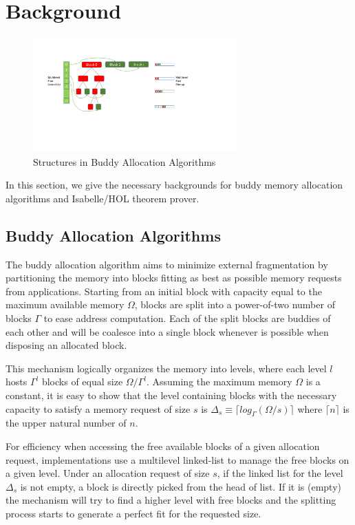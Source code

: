 \section{Background}
\begin{figure}[htbp]
	\centering
	\includegraphics[width=0.7\textwidth]{fig3.pdf}
	\caption{Structures in Buddy Allocation Algorithms}
	\label{fig3}
\end{figure}
In this section, we give the necessary backgrounds for buddy memory allocation algorithms and Isabelle/HOL theorem prover.

\subsection{Buddy Allocation Algorithms}\label{sec:buddy}
The buddy allocation algorithm aims to minimize external fragmentation by partitioning the memory into blocks fitting as best as possible memory requests from applications. Starting from an initial block with capacity equal to the maximum available memory $\Omega$, blocks are split into a power-of-two number of blocks $\Gamma$ to ease address computation. Each of the split blocks are buddies of each other and will be coalesce into a single block whenever is possible when disposing an allocated block. 

This mechanism logically organizes the memory into levels, where each level $l$ hosts $\Gamma^l$ blocks of equal size $\Omega/{\Gamma}^l$. Assuming the maximum memory $\Omega$ is a constant, it is easy to show that the level containing blocks with the necessary capacity to satisfy a memory request of size $s$ is $\Delta_s \equiv \lceil log_\Gamma (\Omega/  s) \rceil$ where $\lceil n \rceil$ is the upper natural number of $n$. 

For efficiency when accessing the free available blocks of a given allocation request, implementations use a multilevel linked-list to manage the free blocks on a given level. Under an allocation request of size $s$, if the linked list for the level $\Delta_s$ is not empty, a block is directly picked from the head of list. If it is (empty) the mechanism will try to find a higher level with free blocks and the splitting process starts to generate a perfect fit for the requested size. 

